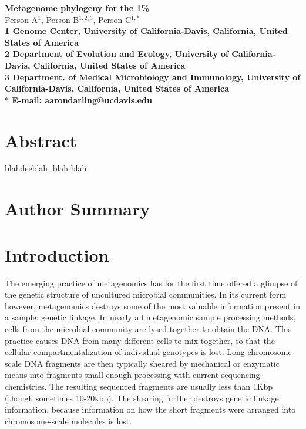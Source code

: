\documentclass[10pt]{article}
\date{}
\begin{document}
\begin{flushleft}
{\Large
\textbf{Metagenome phylogeny for the 1\%}
}
\\
Person A$^{1}$, 
Person B$^{1,2,3}$, 
Person C$^{1,\ast}$
\\
\bf{1} Genome Center, University of California-Davis, California, United States of America
\\
\bf{2} Department of Evolution and Ecology, University of California-Davis, California, United States of America
\\
\bf{3} Department. of Medical Microbiology and Immunology, University of California-Davis, California, United States of America
\\
$\ast$ E-mail: aarondarling@ucdavis.edu
\end{flushleft}

\section*{Abstract}
blahdeeblah, blah blah
\section*{Author Summary}

\section*{Introduction}

The emerging practice of metagenomics has for the first time offered a glimpse of the genetic structure of uncultured microbial communities.
In its current form however, metagenomics destroys some of the most valuable information present in a sample: genetic linkage.
In nearly all metagenomic sample processing methods, cells from the microbial community are lysed together to obtain the DNA.
This practice causes DNA from many different cells to mix together, so that the cellular compartmentalization of individual genotypes is lost.
Long chromosome-scale DNA fragments are then typically sheared by mechanical or enzymatic means into fragments small enough processing with current sequencing chemistries. 
The resulting sequenced fragments are usually less than 1Kbp (though sometimes 10-20kbp). 
The shearing further destroys genetic linkage information, because information on how the short fragments were arranged into chromosome-scale molecules is lost.
\end{document}
